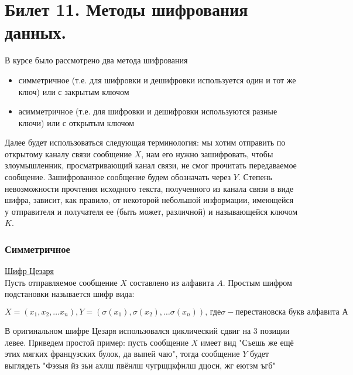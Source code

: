 \newpage
\section {Билет 11. Методы шифрования данных.}
В курсе было рассмотрено два метода шифрования 
\begin {itemize}
\item симметричное (т.е. для шифровки и дешифровки используется один и тот же ключ) или с закрытым ключом 
\item асимметричное (т.е. для шифровки и дешифровки используются разные ключи) или с открытым ключом
\end {itemize}

Далее будет использоваться следующая терминология: мы хотим отправить по открытому каналу связи сообщение $X$, нам его нужно зашифровать, чтобы злоумышленник, просматривающий канал связи, не смог прочитать передаваемое сообщение. Зашифрованное сообщение будем обозначать через $Y$. Степень невозможности прочтения исходного текста, полученного из канала связи в виде шифра, зависит, как правило, от некоторой небольшой информации, имеющейся у отправителя и получателя ее (быть может, различной) и называющейся ключом $K$.

\subsubsection{Симметричное}
\href{https://clck.ru/9KE6e}{Шифр Цезаря} \\
Пусть отправляемое сообщение $X$ составлено из алфавита $A$. Простым шифром подстановки называется шифр вида:

$$ X = (x_1, x_2, \dots x_n), Y = (\sigma (x_1), \sigma(x_2), \dots \sigma(x_n)), \, \text{где} \sigma - \text {перестановска букв алфавита А} $$

В оригинальном шифре Цезаря использовался циклический сдвиг на 3 позиции левее. Приведем простой пример: пусть сообщение $X$ имеет вид "Съешь же ещё этих мягких французских булок, да выпей чаю", тогда сообщение $Y$ будет выглядеть "Фэзыя йз зьи ахлш пвёнлш чугрщцкфнлш дцосн, жг еютзм ъгб" \\

